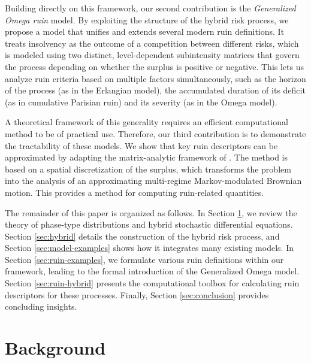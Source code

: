 \documentclass[11pt]{article}
\numberwithin{table}{section}
\numberwithin{figure}{section}
\numberwithin{equation}{section}
\newcommand{\1}{{\mathbf 1}}
\newcommand{\0}{\mat{0}}
\begin{document}
Building directly on this framework, our second contribution is the \textit{Generalized Omega ruin} model. By exploiting the structure of the hybrid risk process, we propose a model that unifies and extends several modern ruin definitions. It treats insolvency as the outcome of a competition between different risks, which is modeled using two distinct, level-dependent subintensity matrices that govern the process depending on whether the surplus is positive or negative. This lets us analyze ruin criteria based on multiple factors simultaneously, such as the horizon of the process (as in the Erlangian model), the accumulated duration of its deficit (as in cumulative Parisian ruin) and its severity (as in the Omega model).

A theoretical framework of this generality requires an efficient computational method to be of practical use. Therefore, our third contribution is to demonstrate the tractability of these models. We show that key ruin descriptors can be approximated by adapting the matrix-analytic framework of \cite{albrecher2022space}. The method is based on a spatial discretization of the surplus, which transforms the problem into the analysis of an approximating multi-regime Markov-modulated Brownian motion. This provides a method for computing ruin-related quantities.

The remainder of this paper is organized as follows. In Section \ref{sec:background}, we review the theory of phase-type distributions and hybrid stochastic differential equations. Section \ref{sec:hybrid} details the construction of the hybrid risk process, and Section \ref{sec:model-examples} shows how it integrates many existing models. In Section \ref{sec:ruin-examples}, we formulate various ruin definitions within our framework, leading to the formal introduction of the Generalized Omega model. Section \ref{sec:ruin-hybrid} presents the computational toolbox for calculating ruin descriptors for these processes. Finally, Section \ref{sec:conclusion} provides concluding insights.


\section{Background}\label{sec:background}
\end{document}
